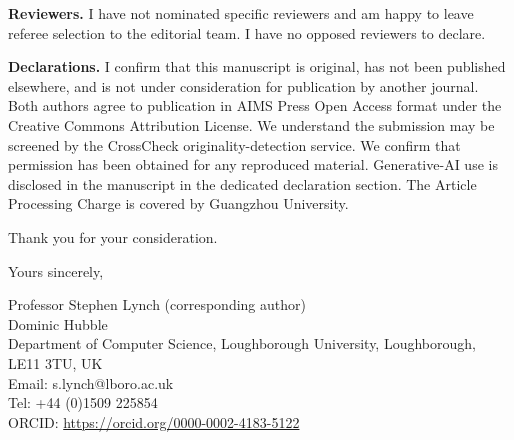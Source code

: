 \documentclass[11pt,a4paper]{article}
\begin{document}
\textbf{Reviewers.} I have not nominated specific reviewers and am happy to leave
referee selection to the editorial team. I have no opposed reviewers to declare.

\textbf{Declarations.} I confirm that this manuscript is original, has not been
published elsewhere, and is not under consideration for publication by another
journal. Both authors agree to publication in AIMS Press Open Access format under
the Creative Commons Attribution License. We understand the submission may be
screened by the CrossCheck originality-detection service. We confirm that
permission has been obtained for any reproduced material. Generative-AI use is
disclosed in the manuscript in the dedicated declaration section. The Article
Processing Charge is covered by Guangzhou University.

Thank you for your consideration.

\bigskip
\noindent Yours sincerely,

\medskip
\noindent Professor Stephen Lynch (corresponding author)\\
Dominic Hubble\\
Department of Computer Science, Loughborough University, Loughborough, LE11 3TU, UK\\
Email: s.lynch@lboro.ac.uk\\
Tel: +44 (0)1509 225854\\
ORCID: \url{https://orcid.org/0000-0002-4183-5122}
\end{document}
